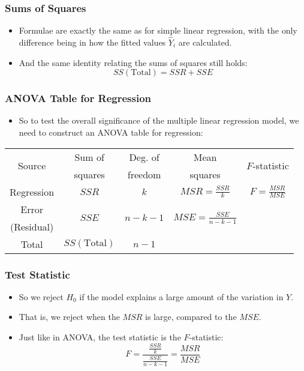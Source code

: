 \documentclass[14pt]{beamer}
\begin{document}
\begin{frame}
	\frametitle{Sums of Squares}
	
	\begin{itemize}[label={\color{blue}$\blacktriangleright$}]
		\item Formulae are exactly the same as for simple linear regression, with the only difference being in how the fitted values $\hat{Y}_i$ are calculated.
		
		\item And the same identity relating the sums of squares still holds:
		\[
		SS(\text{Total}) = SSR + SSE
		\]
	\end{itemize}
	
\end{frame}
\begin{frame}
	\frametitle{ANOVA Table for Regression}
	
	\begin{itemize}[label={\color{blue}$\blacktriangleright$}]
		\item So to test the overall significance of the multiple linear regression model, we need to construct an ANOVA table for regression:
	\end{itemize}
	
	\begin{table}
		\small
		\begin{tabular}{ccccc}
			\toprule
			\multirow{2}{*}{Source} & Sum of & Deg. of & Mean & \multirow{2}{*}{$F$-statistic} \\
			& squares & freedom & squares & \\
			\midrule
			Regression & $SSR$ & $k$ & $MSR = \frac{SSR}{k}$ & $F = \frac{MSR}{MSE}$ \\[1ex]
			Error& \multirow{2}{*}{$SSE$} & \multirow{2}{*}{$n-k-1$} & \multirow{2}{*}{$MSE = \frac{SSE}{n-k-1}$} & \\
			(Residual) & & & & \\[1ex]
			\midrule
			Total & $SS(\text{Total})$ & $n-1$ & & \\
			\bottomrule
		\end{tabular}
	\end{table}
	
\end{frame}
\begin{frame}
	\frametitle{Test Statistic}
	
	\begin{itemize}[label={\color{blue}$\blacktriangleright$}]
		\item So we reject $H_0$ if the model explains a large amount of the variation in $Y$.
		
		\item That is, we reject when the $MSR$ is large, compared to the $MSE$.
		
		\item Just like in ANOVA, the test statistic is the $F$-statistic:
		\[
		F = \frac{\frac{SSR}{k}}{\frac{SSE}{n-k-1}} = \frac{MSR}{MSE}
		\]
	\end{itemize}
	
\end{frame}
\end{document}
